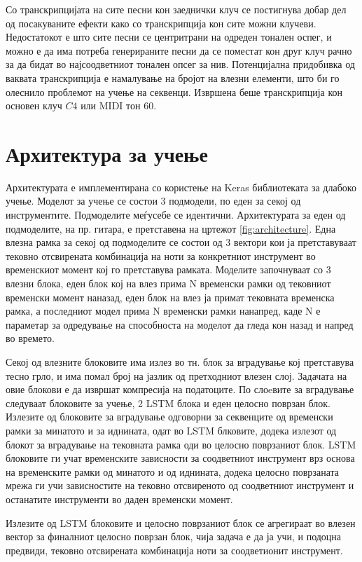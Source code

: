Со транскрипцијата на сите песни кон заеднички клуч се постигнува добар дел од посакуваните ефекти како со транскрипција кон сите можни клучеви. Недостатокот е што сите песни се центритрани на одреден тонален оспег, и можно е да има потреба генерираните песни да се поместат кон друг клуч рачно за да бидат во најсоодветниот тонален опсег за нив. Потенцијална придобивка од ваквата транскрипција е намалување на бројот на влезни елементи, што би го олеснило проблемот на учење на секвенци. Извршена беше транскрипција кон основен клуч $C4$ или MIDI тон 60.

\section{Архитектура за учење}

Архитектурата е имплементирана со користење на Keras библиотеката за длабоко учење. Моделот за учење се состои 3 подмодели, по еден за секој од инструментите. Подмоделите меѓусебе се идентични. Архитектурата за еден од подмоделите, на пр. гитара, е претставена на цртежот \ref{fig:architecture}. Една влезна рамка за секој од подмоделите се состои од 3 вектори кои ја претставуваат тековно отсвирената комбинација на ноти за конкретниот инструмент во временскиот момент кој го претставува рамката. Моделите започнуваат со 3 влезни блока, еден блок кој на влез прима N временски рамки од тековниот временски момент наназад, еден блок на влез ја примат тековната временска рамка, а последниот модел прима N временски рамки нанапред, каде N е параметар за одредување на способноста на моделот да гледа кон назад и напред во времето.

Секој од влезните блоковите има излез во тн. блок за вградување кој претставува тесно грло, и има помал број на јазлик од претходниот влезен слој. Задачата на овие блокови е да извршат компресија на податоците. По слоeвите за вградување следуваат блоковите за учење, 2 LSTM блока и еден целосно поврзан блок. Излезите од блоковите за вградување одговорни за секвенците од временски рамки за минатото и за иднината, одат во LSTM блковите, додека излезот од блокот за вградување на тековната рамка оди во целосно поврзаниот блок. LSTM блоковите ги учат временските зависности за соодветниот инструмент врз основа на временските рамки од минатото и од иднината, додека целосно поврзаната мрежа ги учи зависностите на тековно отсвиреното од соодветниот инструмент и останатите инструменти во даден временски момент. 

Излезите од LSTM блоковите и целосно поврзаниот блок се агрегираат во влезен вектор за финалниот целосно поврзан блок, чија задача е да ја учи, и подоцна предвиди, тековно отсвирената комбинација ноти за соодветионит инструмент.

